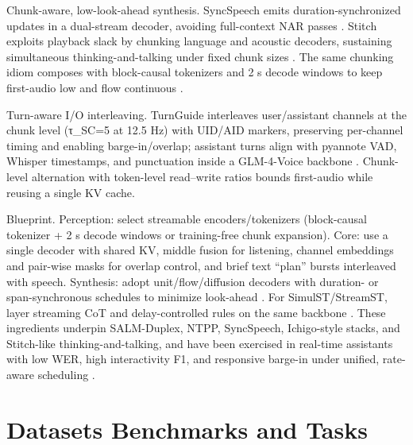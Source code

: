 \documentclass{article}
\begin{document}
Chunk-aware, low-look-ahead synthesis. SyncSpeech emits duration-synchronized updates in a dual-stream decoder, avoiding full-context NAR passes \cite{sheng2025syncspeechlowlatencyefficientdualstreamt}. Stitch exploits playback slack by chunking language and acoustic decoders, sustaining simultaneous thinking-and-talking under fixed chunk sizes \cite{chiang2025stitchsimultaneousthinkingtalkingchunked}. The same chunking idiom composes with block-causal tokenizers and 2 s decode windows to keep first-audio low and flow continuous \cite{zeng2024scalingspeechtextpretrainingsyntheticint}.

Turn-aware I/O interleaving. TurnGuide interleaves user/assistant channels at the chunk level (τ_SC=5 at 12.5 Hz) with UID/AID markers, preserving per-channel timing and enabling barge-in/overlap; assistant turns align with pyannote VAD, Whisper timestamps, and punctuation inside a GLM-4-Voice backbone \cite{cui2025thinkbeforeyoutalkenhancingmeaningfuldia}. Chunk-level alternation with token-level read--write ratios bounds first-audio while reusing a single KV cache.

Blueprint. Perception: select streamable encoders/tokenizers (block-causal tokenizer + 2 s decode windows or training-free chunk expansion). Core: use a single decoder with shared KV, middle fusion for listening, channel embeddings and pair-wise masks for overlap control, and brief text ``plan'' bursts interleaved with speech. Synthesis: adopt unit/flow/diffusion decoders with duration- or span-synchronous schedules to minimize look-ahead \cite{sheng2025syncspeechlowlatencyefficientdualstreamt}. For SimulST/StreamST, layer streaming CoT and delay-controlled rules on the same backbone \cite{guo2025streamuniachievingstreamingspeechtransla}. These ingredients underpin SALM-Duplex, NTPP, SyncSpeech, Ichigo-style stacks, and Stitch-like thinking-and-talking, and have been exercised in real-time assistants with low WER, high interactivity F1, and responsive barge-in under unified, rate-aware scheduling \cite{ma2024languagemodelcanlistenwhilespeaking,hu2025salmduplexefficientdirectmodelingspeechl,wang2025ntppgenerativespeechlanguagemodelingdual,chiang2025stitchsimultaneousthinkingtalkingchunked,zeng2024scalingspeechtextpretrainingsyntheticint}.









\section{Datasets Benchmarks and Tasks} \label{sec:datasetsbenchmarksandtasks}
\end{document}
